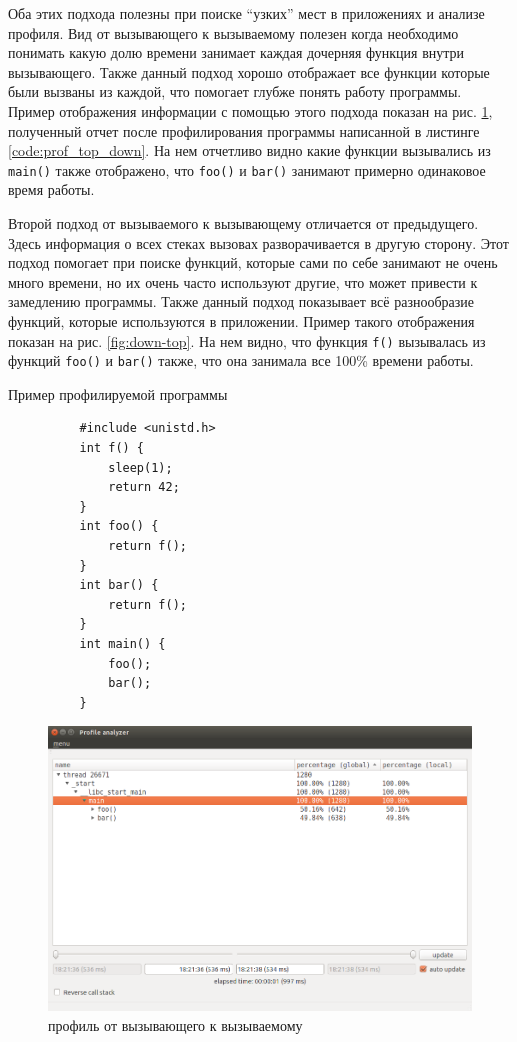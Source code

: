     Оба этих подхода полезны при поиске \enquote{узких} мест в приложениях и анализе профиля. Вид от вызывающего к вызываемому полезен когда необходимо понимать какую долю времени занимает каждая дочерняя функция внутри вызывающего. Также данный подход хорошо отображает все функции которые были вызваны из каждой, что помогает глубже понять работу программы. Пример отображения информации с помощью этого подхода показан на рис. \ref{fig:top-down}, полученный отчет после профилирования программы написанной в листинге \ref{code:prof_top_down}. На нем отчетливо видно какие функции вызывались из \verb|main()| также отображено, что \verb|foo()| и \verb|bar()| занимают примерно одинаковое время работы.
    
    Второй подход от вызываемого к вызывающему отличается от предыдущего. Здесь информация о всех стеках вызовах разворачивается в другую сторону. Этот подход помогает при поиске функций, которые сами по себе занимают не очень много времени, но их очень часто используют другие, что может привести к замедлению программы. Также данный подход показывает всё разнообразие функций, которые используются в приложении. Пример такого отображения показан на рис. \ref{fig:down-top}. На нем видно, что функция \verb|f()| вызывалась из функций \verb|foo()| и \verb|bar()| также, что она занимала все 100\% времени работы.

    \begin{algorithm}[!h]
      \caption{Пример профилируемой программы}\label{code:prof_top_down}
      \begin{lstlisting}
          #include <unistd.h>
          int f() { 
              sleep(1); 
              return 42; 
          }
          int foo() { 
              return f(); 
          }
          int bar() { 
              return f(); 
          }
          int main() {
              foo();
              bar();
          }
      \end{lstlisting}
	\end{algorithm}    
    
    \begin{figure}[H]
        \caption{профиль от вызывающего к вызываемому}
        \label{fig:top-down}
        \centering
        \includegraphics[scale=0.47]{images/top-down}
    \end{figure}    
        
